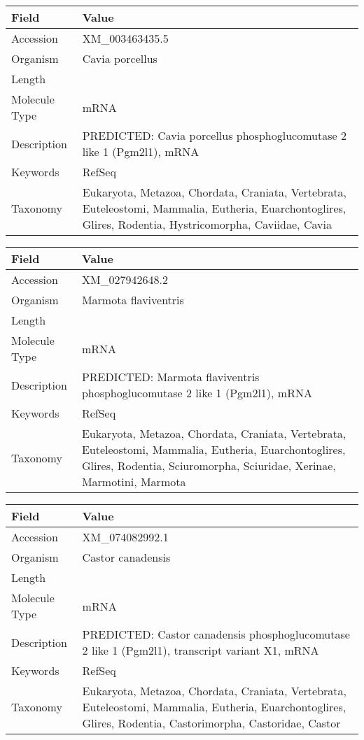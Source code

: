 \documentclass[10pt]{article}
\begin{document}
{\footnotesize
\begin{longtable}{>{\raggedright\arraybackslash}p{4.5cm} >{\raggedright\arraybackslash}p{11.5cm}}
\textbf{Field} & \textbf{Value} \\
\hline
Accession & XM\_003463435.5 \\
Organism & Cavia porcellus \\
Length & 8261 \\
Molecule Type & mRNA \\
Description & PREDICTED: Cavia porcellus phosphoglucomutase 2 like 1 (Pgm2l1), mRNA \\
Keywords & RefSeq \\
Taxonomy & Eukaryota, Metazoa, Chordata, Craniata, Vertebrata, Euteleostomi, Mammalia, Eutheria, Euarchontoglires, Glires, Rodentia, Hystricomorpha, Caviidae, Cavia \\
\end{longtable}
}

{\footnotesize
\begin{longtable}{>{\raggedright\arraybackslash}p{4.5cm} >{\raggedright\arraybackslash}p{11.5cm}}
\textbf{Field} & \textbf{Value} \\
\hline
Accession & XM\_027942648.2 \\
Organism & Marmota flaviventris \\
Length & 7740 \\
Molecule Type & mRNA \\
Description & PREDICTED: Marmota flaviventris phosphoglucomutase 2 like 1 (Pgm2l1), mRNA \\
Keywords & RefSeq \\
Taxonomy & Eukaryota, Metazoa, Chordata, Craniata, Vertebrata, Euteleostomi, Mammalia, Eutheria, Euarchontoglires, Glires, Rodentia, Sciuromorpha, Sciuridae, Xerinae, Marmotini, Marmota \\
\end{longtable}
}

{\footnotesize
\begin{longtable}{>{\raggedright\arraybackslash}p{4.5cm} >{\raggedright\arraybackslash}p{11.5cm}}
\textbf{Field} & \textbf{Value} \\
\hline
Accession & XM\_074082992.1 \\
Organism & Castor canadensis \\
Length & 8074 \\
Molecule Type & mRNA \\
Description & PREDICTED: Castor canadensis phosphoglucomutase 2 like 1 (Pgm2l1), transcript variant X1, mRNA \\
Keywords & RefSeq \\
Taxonomy & Eukaryota, Metazoa, Chordata, Craniata, Vertebrata, Euteleostomi, Mammalia, Eutheria, Euarchontoglires, Glires, Rodentia, Castorimorpha, Castoridae, Castor \\
\end{longtable}
}
\end{document}
